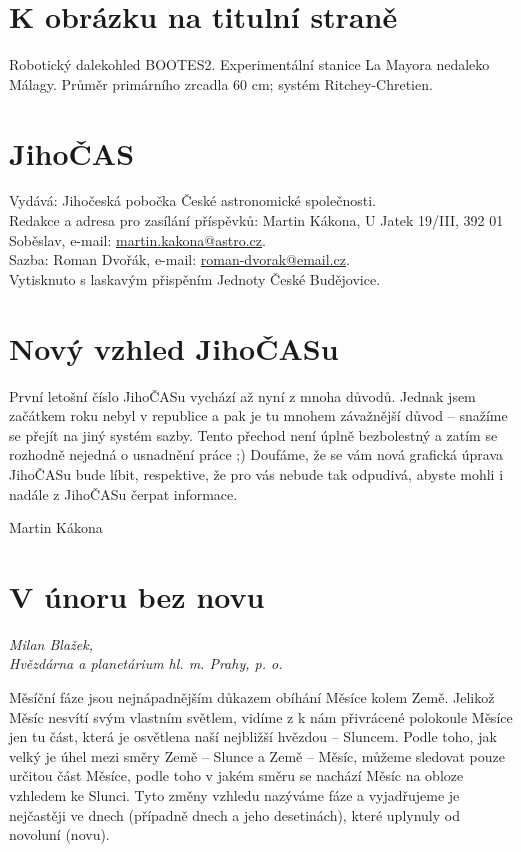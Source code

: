 \documentclass[10pt,a5paper,twoside]{book}
\newcommand{\autor}[1]{
	\begin{flushright}
	\textit{#1}
	\end{flushright}
}
\begin{document}
 

%



\section*{K obrázku na titulní straně}
Robotický dalekohled BOOTES2. Experimentální stanice La Mayora nedaleko Málagy. Průměr primárního zrcadla 60 cm; systém Ritchey-Chretien.
\vfill
\section*{JihoČAS}
Vydává: Jihočeská pobočka České astronomické společnosti.\\
Redakce a adresa pro zasílání příspěvků: Martin Kákona, U Jatek 19/III, 392 01 Soběslav, e-mail: \href{mailto:martin.kakona@astro.cz}{martin.kakona@astro.cz}.\\
Sazba: Roman Dvořák, e-mail: \href{mailto:roman-dvorak@email.cz}{roman-dvorak@email.cz}.\\
Vytisknuto s laskavým přispěním Jednoty České Budějovice.\newpage


\section*{Nový vzhled JihoČASu}
První letošní číslo JihoČASu vychází až nyní z mnoha důvodů. Jednak jsem začátkem roku nebyl v republice a pak je tu mnohem závažnější důvod – snažíme se přejít na jiný systém sazby. Tento přechod není úplně bezbolestný a zatím se rozhodně nejedná o usnadnění práce ;)
Doufáme, že se vám nová grafická úprava JihoČASu bude líbit, respektive, že pro vás nebude tak odpudivá, abyste mohli i nadále z JihoČASu čerpat informace.

\begin{flushright}
Martin Kákona
\end{flushright}
\newpage

\section*{V únoru bez novu}
\autor{Milan Blažek,\\ Hvězdárna a planetárium hl. m. Prahy, p. o.}

Měsíční fáze jsou nejnápadnějším důkazem obíhání Měsíce kolem Země. Jelikož Měsíc nesvítí svým vlastním světlem, vidíme z k nám přivrácené polokoule Měsíce jen tu část, která je osvětlena naší nejbližší hvězdou – Sluncem. Podle toho, jak velký je úhel mezi směry Země – Slunce a Země – Měsíc, můžeme sledovat pouze určitou část Měsíce, podle toho v jakém směru se nachází Měsíc na obloze vzhledem ke Slunci. Tyto změny vzhledu nazýváme fáze a vyjadřujeme je nejčastěji ve dnech (případně dnech a jeho desetinách), které uplynuly od novoluní (novu). 
\end{document}
